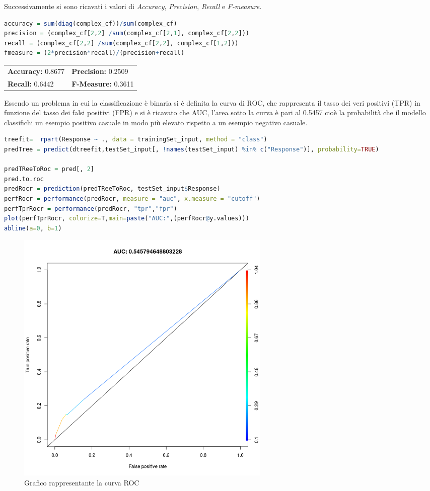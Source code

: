 \documentclass[letterpaper,11pt]{article}
\begin{document}
Successivamente si sono ricavati i valori di \textit{Accuracy}, \textit{Precision}, \textit{Recall} e \textit{F-measure}.

\begin{lstlisting}[language=R]
accuracy = sum(diag(complex_cf))/sum(complex_cf)
precision = (complex_cf[2,2] /sum(complex_cf[2,1], complex_cf[2,2]))
recall = (complex_cf[2,2] /sum(complex_cf[2,2], complex_cf[1,2]))
fmeasure = (2*precision*recall)/(precision+recall)
\end{lstlisting}

\begin{table}[h!]
\centering
\begin{tabular}{ll}
\textbf{Accuracy:} 0.8677 & \textbf{Precision:} 0.2509\\
\textbf{Recall:} 0.6442 & \textbf{F-Measure:} 0.3611
\end{tabular}
\end{table}

Essendo un problema in cui la classificazione è binaria si è definita la curva di ROC, che rappresenta il tasso dei veri positivi (TPR) in funzione del tasso dei falsi positivi  (FPR) e si è ricavato che AUC, l'area sotto la curva è pari al 0.5457 cioè  la probabilità che il modello classifichi un esempio positivo casuale in modo più elevato rispetto a un esempio negativo casuale.

\begin{lstlisting}[language=R]
treefit=  rpart(Response ~ ., data = trainingSet_input, method = "class")
predTree = predict(dtreefit,testSet_input[, !names(testSet_input) %in% c("Response")], probability=TRUE)

predTReeToRoc = pred[, 2]
pred.to.roc
predRocr = prediction(predTReeToRoc, testSet_input$Response)
perfRocr = performance(predRocr, measure = "auc", x.measure = "cutoff")
perfTprRocr = performance(predRocr, "tpr","fpr")
plot(perfTprRocr, colorize=T,main=paste("AUC:",(perfRocr@y.values)))
abline(a=0, b=1)
\end{lstlisting}

\begin{figure}[H]
    \centering
    \includegraphics[width=0.6\textwidth]{Img/[D-TREE] Model Evalutation/plot.png}
    \caption{Grafico rappresentante la curva ROC}
\end{figure}
\end{document}

